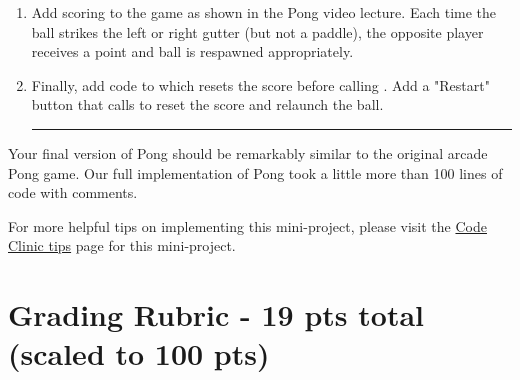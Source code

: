 \documentclass[a4paper,10pt]{article}
\begin{document}
\begin{CJK}{UTF8}{gkai}
\begin{enumerate}
\item Add scoring to the game as shown in the Pong video lecture. Each time the ball strikes the left or right gutter (but not a paddle), the opposite player receives a point and ball is respawned appropriately.

\item Finally, add code to {\color{red}{new\_game}} which resets the score before calling {\color{red}{spawn\_ball}}. Add a "Restart" button that calls {\color{red}{new\_game}} to reset the score and relaunch the ball.

\rule{\textwidth}{0.5pt}

\end{enumerate}

\noindent Your final version of Pong should be remarkably similar to the original arcade Pong game. Our full implementation of Pong took a little more than 100 lines of code with comments.

\noindent For more helpful tips on implementing this mini-project, please visit the \href{https://class.coursera.org/interactivepython1-010/wiki/pong_tips}{Code Clinic tips} page for this mini-project.

\section*{Grading Rubric - 19 pts total (scaled to 100 pts)}


\end{CJK}
\end{document}
